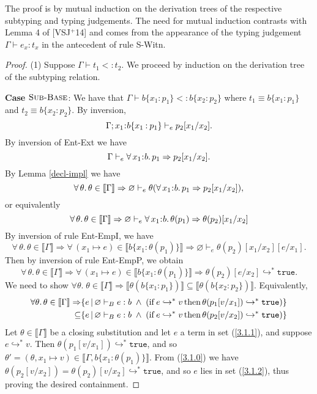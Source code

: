 \documentclass[11pt]{article}
\newcommand{\bind}{\hspace{0.05em}{:}\hspace{0.05em}} %
\newcommand{\col}{\mathbin{:}}       %
\newcommand{\lb}{\llbracket}         %
\newcommand{\rb}{\rrbracket}         %
\newcommand{\many}{\hookrightarrow^*}
\newcommand{\true}{\mathtt{true}}
\begin{document}
The proof is by mutual induction on the derivation trees of the respective subtyping and typing judgements. The need for mutual induction contrasts with Lemma 4 of [VSJ$^+$14] and comes from the appearance of the typing judgement $\Gamma \vdash e_x : t_x $ in the antecedent of rule {\sc S-Witn}.
     
\begin{proof} 
(1) Suppose $\Gamma \vdash t_1 <: t_2$. We proceed by induction on the derivation tree of the subtyping relation.

{\bf Case} $\textsc{Sub-Base}$: We have that 
$\Gamma \vdash b\{x_1\col p_1\} <: b\{x_2\col p_2\}$ where $t_1 \equiv b\{x_1\col p_1\}$ and $t_2 \equiv b\{x_2\col p_2\}$.
By inversion, 
\[\Gamma; x_1\bind b\{x_1\col p_1\} \vdash_e  p_2[x_1/x_2].\] 
By inversion of {\sc Ent-Ext} we have 
\begin{equation}\Gamma \vdash_e \forall\, x_1\bind b.\, p_1 \Rightarrow p_2[x_1/x_2]
.\end{equation}
By Lemma \ref{decl-impl} we have
\[
\forall\,\theta.\,\theta\in\lb\Gamma\rb \Rightarrow 
\varnothing \vdash_e \theta(\forall\, x_1\bind b.\, p_1 \Rightarrow p_2[x_1/x_2])
,\]
or equivalently
\begin{equation}
\forall\,\theta.\,\theta\in\lb\Gamma\rb \Rightarrow 
\varnothing \vdash_e \forall\, x_1\bind b.\, \theta(p_1) \Rightarrow \theta(p_2)[x_1/x_2]
\end{equation}
By inversion of rule {\sc Ent-EmpI}, we have
\begin{equation}
\forall\,\theta.\,\theta\in\lb\Gamma\rb \Rightarrow 
\forall\, (x_1\mapsto e)\in \lb b\{x_1\col \theta(p_1)\}\rb \Rightarrow \varnothing \vdash_e \theta(p_2)[x_1/x_2][e/x_1].
\end{equation}
Then by inversion of rule {\sc Ent-EmpP}, we obtain
\begin{equation}\label{3.1.0}
\forall\,\theta.\,\theta\in\lb\Gamma\rb \Rightarrow 
\forall\, (x_1\mapsto e)\in \lb b\{x_1\col \theta(p_1)\}\rb \Rightarrow \theta(p_2)[e/x_2] \many \true.
\end{equation}
We need to show $\forall \theta.\; 
\theta \in \lb \Gamma \rb \Rightarrow 
\lb\theta(b\{x_1:p_1\})\rb \subseteq \lb\theta(b\{x_2:p_2\})\rb.$
Equivalently,
\begin{align}\label{3.1.1}
\forall\theta.\,\theta\in\lb\Gamma\rb \Rightarrow&
\{ e \,|\, \varnothing \vdash_B e:b \;\wedge\; 
  ({\rm if}\, e \many v \,{\rm then}\, \theta(p_1[v/x_1]) \many \true)\}\\
\subseteq &\{ e \,|\, \varnothing \vdash_B e:b \;\wedge\; 
  ({\rm if}\, e \many v \,{\rm then}\, \theta(p_2[v/x_2]) \many \true)\}\label{3.1.2}
\end{align}
Let $\theta \in \lb\Gamma\rb$ be a closing substitution and
let $e$ a term in set (\ref{3.1.1}), and suppose $e \many v$. Then $\theta(p_1[v/x_1]) \many \true$, and so $\theta' = (\theta, x_1 \mapsto v) \in \lb\Gamma, b\{ x_1\col \theta(p_1)\}\rb$.
From (\ref{3.1.0}) we have
$\theta(p_2[v/x_2]) = \theta(p_2)[v/x_2] \many \true$,
and so $e$ lies in set (\ref{3.1.2}), thus proving the desired containment.


\end{proof}
\end{document}
